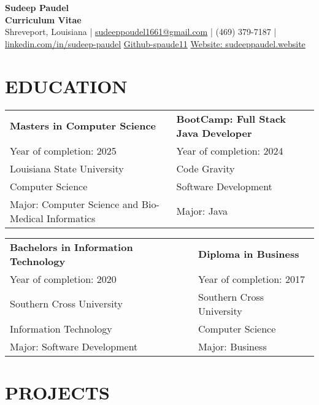 \documentclass[a4paper,9pt]{article}
\begin{document}
\pagestyle{empty}

\begin{center}
\textbf{\Large Sudeep Paudel}\\[3pt] %
\textbf{Curriculum Vitae}\\[1pt] %
Shreveport, Louisiana | \href{mailto:sudeeppoudel1661@gmail.com}{sudeeppoudel1661@gmail.com} |
(469) 379-7187 | \href{https://www.linkedin.com/in/sudeep-paudel-4853ab28b/}{linkedin.com/in/sudeep-paudel} \href{https://github.com/spaude11}{Github-spaude11}   
 \href{https://www.sudeeppaudel.website/}{Website: sudeeppaudel.website}
\end{center}

\section*{EDUCATION}

\noindent
\begin{tabular}{@{}p{} p{}@{}}
    \textbf{Masters in Computer Science} & \textbf{BootCamp: Full Stack Java Developer} \\
    Year of completion: 2025 & Year of completion: 2024 \\
    Louisiana State University & Code Gravity \\
    Computer Science & Software Development \\
    Major: Computer Science and Bio-Medical Informatics & Major: Java \\
\end{tabular}

\noindent
\begin{tabular}{@{}p{} p{}@{}}
    \textbf{Bachelors in Information Technology} & \textbf{Diploma in Business} \\
    Year of completion: 2020 & Year of completion: 2017 \\
    Southern Cross University & Southern Cross University \\
    Information Technology & Computer Science \\
    Major: Software Development & Major: Business \\
\end{tabular}

\noindent


\section*{PROJECTS}
\end{document}
